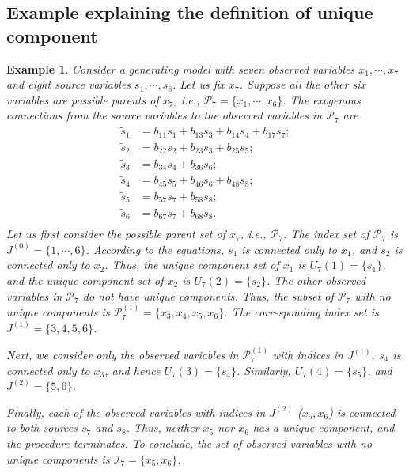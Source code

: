 \documentclass[12pt]{article}
\newtheorem{example}{Example}
\begin{document}
\subsection{Example explaining the definition of unique component}\label{app:example_unique_component}
\begin{example}
Consider a generating model with seven observed variables $x_1,\cdots,x_7$ and eight source variables $s_1,\cdots,s_8$. Let us fix $x_7$. Suppose all the other six variables are possible parents of $x_7$, i.e., $\mathcal{P}_7=\{x_1,\cdots, x_6\}$. The exogenous connections from the source variables to the observed variables in $\mathcal{P}_7$ are
\begin{align*}
\tilde{s}_1 &= b_{11}s_1 + b_{13}s_3 + b_{14}s_4 + b_{17}s_7; \\
\tilde{s}_2 &= b_{22}s_2 + b_{23}s_3 + b_{25}s_5; \\
\tilde{s}_3 &= b_{34}s_4 + b_{36}s_6; \\
\tilde{s}_4 &= b_{45}s_5 + b_{46}s_6 + b_{48}s_8; \\
\tilde{s}_5 &= b_{57} s_7 + b_{58} s_8; \\
\tilde{s}_6 &= b_{67} s_7 + b_{68} s_8. \\
\end{align*}
Let us first consider the possible parent set of $x_7$, i.e., $\mathcal{P}_7$. The index set of $\mathcal{P}_7$ is $J^{(0)}=\{1,\cdots,6\}$. According to the equations, $s_1$ is connected only to $x_1$, and $s_2$ is connected only to $x_2$. Thus, the unique component set of $x_1$ is $U_7(1)=\{s_1\}$, and the unique component set of $x_2$ is $U_7(2)=\{s_2\}$. The other observed variables in $\mathcal{P}_7$ do not have unique components. Thus, the subset of $\mathcal{P}_7$ with no unique components is $\mathcal{P}_7^{(1)}=\{x_3,x_4,x_5,x_6\}$. The corresponding index set is $J^{(1)} = \{3, 4, 5, 6\}$.

Next, we consider only the observed variables in $\mathcal{P}_7^{(1)}$ with indices in $J^{(1)}$. $s_4$ is connected only to $x_3$, and hence $U_7(3)=\{s_4\}$. Similarly, $U_7(4)=\{s_5\}$, and $J^{(2)} = \{5, 6\}$.

Finally, each of the observed variables with indices in $J^{(2)}$ ($x_5,x_6$) is connected to both sources $s_7$ and $s_8$. Thus, neither $x_5$ nor $x_6$ has a unique component, and the procedure terminates. To conclude, the set of observed variables with no unique components is $\mathcal{I}_7 = \{x_5, x_6\}$.
\end{example}
\end{document}
